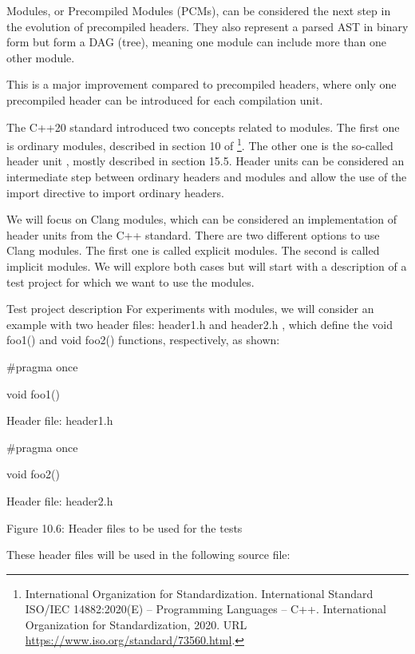 Modules, or Precompiled Modules (PCMs), can be considered the next step in the evolution of precompiled headers. They also represent a parsed AST in binary form but form a DAG (tree), meaning one module can include more than one other module.

This is a major improvement compared to precompiled headers, where only one precompiled header can be introduced for each compilation unit.

The C++20 standard introduced two concepts related to modules. The first one is ordinary modules, described in section 10 of \footnote{International Organization for Standardization. International Standard ISO/IEC 14882:2020(E) – Programming Languages – C++. International Organization for Standardization, 2020. URL \url{https://www.iso.org/standard/73560.html}.}. The other one is the so-called header unit , mostly described in section 15.5. Header units can be considered an intermediate step between ordinary headers and modules and allow the use of the import directive to import ordinary headers.

We will focus on Clang modules, which can be considered an implementation of header units from the C++ standard. There are two different options to use Clang modules. The first one is called explicit modules. The second is called implicit modules. We will explore both cases but will start with a description of a test project for which we want to use the modules.

Test project description
For experiments with modules, we will consider an example with two header files: header1.h and header2.h , which define the void foo1() and void foo2() functions, respectively, as shown:

\begin{cpp}
#pragma once

void foo1() {}
\end{cpp}

Header file: header1.h

\begin{cpp}
#pragma once

void foo2() {}
\end{cpp}

Header file: header2.h

\begin{center}
Figure 10.6: Header files to be used for the tests
\end{center}


These header files will be used in the following source file:

